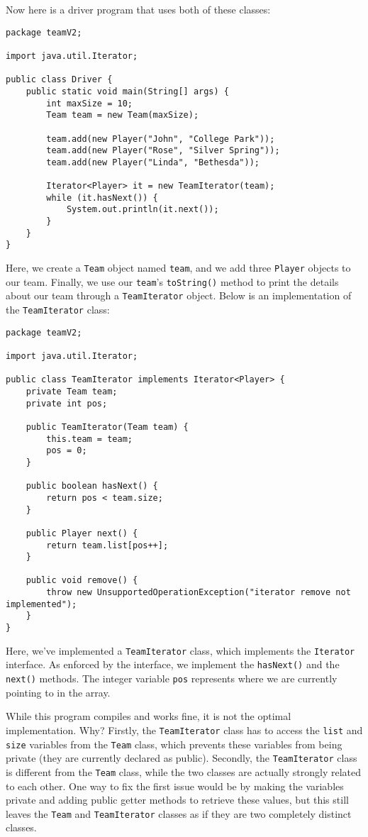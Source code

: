Now here is a driver program that uses both of these classes:

\begin{lstlisting}
package teamV2;

import java.util.Iterator;

public class Driver {
	public static void main(String[] args) {
		int maxSize = 10;
		Team team = new Team(maxSize);

		team.add(new Player("John", "College Park"));
		team.add(new Player("Rose", "Silver Spring"));
		team.add(new Player("Linda", "Bethesda"));

		Iterator<Player> it = new TeamIterator(team);
		while (it.hasNext()) {
			System.out.println(it.next());
		}
	}
}
\end{lstlisting}

Here, we create a \verb!Team! object named \verb!team!, and we add three \verb!Player! objects to our team. Finally, we use our \verb!team!'s \verb!toString()! method to print the details about our team through a \verb!TeamIterator! object. Below is an implementation of the \verb!TeamIterator! class: 

\begin{lstlisting}
package teamV2;

import java.util.Iterator;

public class TeamIterator implements Iterator<Player> {
	private Team team;
	private int pos;

	public TeamIterator(Team team) {
		this.team = team;
		pos = 0;
	}

	public boolean hasNext() {
		return pos < team.size;
	}

	public Player next() {
		return team.list[pos++];
	}

	public void remove() {
		throw new UnsupportedOperationException("iterator remove not implemented");
	}
}
\end{lstlisting}

Here, we've implemented a \verb!TeamIterator! class, which implements the \verb!Iterator! interface. As enforced by the interface, we implement the \verb!hasNext()! and the \verb!next()! methods. The integer variable \verb!pos! represents where we are currently pointing to in the array. 


While this program compiles and works fine, it is not the optimal implementation. Why? Firstly, the \verb!TeamIterator! class has to access the \verb!list! and \verb!size! variables from the \verb!Team! class, which prevents these variables from being private (they are currently declared as public). Secondly, the \verb!TeamIterator! class is different from the \verb!Team! class, while the two classes are actually strongly related to each other. One way to fix the first issue would be by making the variables private and adding public getter methods to retrieve these values, but this still leaves the \verb!Team! and \verb!TeamIterator! classes as if they are two completely distinct classes. \\

